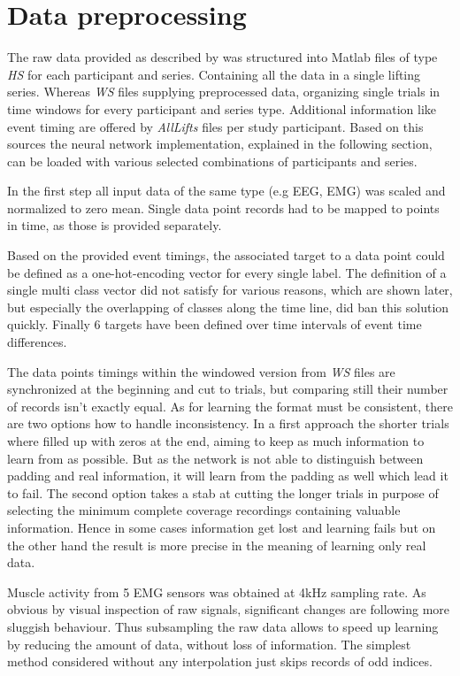 \documentclass{article} %
\begin{document}
\section{Data preprocessing}
The raw data provided as described by \cite{nature} was structured into Matlab files of type \textit{HS} for each participant and series. Containing all the data in a single lifting series. Whereas \textit{WS} files supplying preprocessed data, organizing single trials in time windows for every participant and series type. Additional information like event timing are offered by \textit{AllLifts} files per study participant. Based on this sources the neural network implementation, explained in the following section, can be loaded with various selected combinations of participants and series.

In the first step all input data of the same type (e.g EEG, EMG) was scaled and normalized to zero mean. Single data point records had to be mapped to points in time, as those is provided separately.

Based on the provided event timings, the associated target to a data point could be defined as a one-hot-encoding vector for every single label. The definition of a single multi class vector did not satisfy for various reasons, which are shown later, but especially the overlapping of classes along the time line, did ban this solution quickly. Finally 6 targets have been defined over time intervals of event time differences.

The data points timings within the windowed version from \textit{WS} files are synchronized at the beginning and cut to trials, but comparing still their number of records isn't exactly equal. As for learning the format must be consistent, there are two options how to handle inconsistency. In a first approach the shorter trials where filled up with zeros at the end, aiming to keep as much information to learn from as possible. But as the network is not able to distinguish between padding and real information, it will learn from the padding as well which lead it to fail. The second option takes a stab at cutting the longer trials in purpose of selecting the minimum complete coverage recordings containing valuable information. Hence in some cases information get lost and learning fails but on the other hand the result is more precise in the meaning of learning only real data.

Muscle activity from 5 EMG sensors was obtained at 4kHz sampling rate. As obvious by visual inspection of raw signals, significant changes are following more sluggish behaviour. Thus subsampling the raw data allows to speed up learning by reducing the amount of data, without loss of information. The simplest method considered without any interpolation just skips records of odd indices.\\
\end{document}
